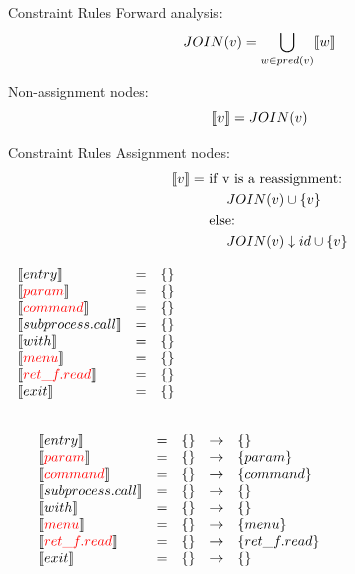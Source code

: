 \begin{frame}{Constraint Rules}{}
  {\color{red} Forward} analysis:
  \[ JOIN(v) = \bigcup_{ w \in pred(v)} \llbracket w \rrbracket \]

  Non-assignment nodes:
    \[ \llbracket v \rrbracket = JOIN(v) \]
\end{frame}


\begin{frame}{Constraint Rules}{}
    Assignment nodes:
  \begin{align*}
  \llbracket v \rrbracket = &\text{ if v is a reassignment:}\\
  &\phantom{==}JOIN(v) \cup \{ v \}\\
  &\text{ else:}\\
  &\phantom{==}JOIN(v) \downarrow id \cup \{ v \}\\
  \end{align*}
\end{frame}

\begin{frame}
\[
\begin{array}{lclcl}
  \constraint{entry} & = & \{\} &\phantom{hahahahhh}\\
  \assignconstraint{param} & = & \{\} &\\
  \assignconstraint{command} & = & \{\}&\\
  \constraint{subprocess.call} & = & \{\}&\\
  \constraint{with} & = & \{\}&\\
  \assignconstraint{menu} & = & \{\}&\\
  \assignconstraint{ret\_f.read} & = & \{\}&\\
  \constraint{exit} & = & \{\}&\\
  && \phantom{\{command, param\}} && \phantom{\{command, param\}}
\end{array}
\]
\end{frame}

\begin{frame}
\[
\begin{array}{lclcl}
  \constraint{entry} & = & \{\} & \rightarrow & \{\}\\
  \assignconstraint{param} & = & \{\} & \rightarrow &\{param\}\\
  \assignconstraint{command} & = & \{\}& \rightarrow &\{command\}\\
  \constraint{subprocess.call} & = & \{\}& \rightarrow &\{\}\\
  \constraint{with} & = & \{\}&\rightarrow & \{\}\\
  \assignconstraint{menu} & = & \{\}& \rightarrow & \{menu\}\\
  \assignconstraint{ret\_f.read} & = & \{\}&\rightarrow & \{ret\_f.read\}\\
  \constraint{exit} & = & \{\}&\rightarrow & \{\}\\
  && && \phantom{\{command, param\}\{command, param\}}
\end{array}
\]
\end{frame}

